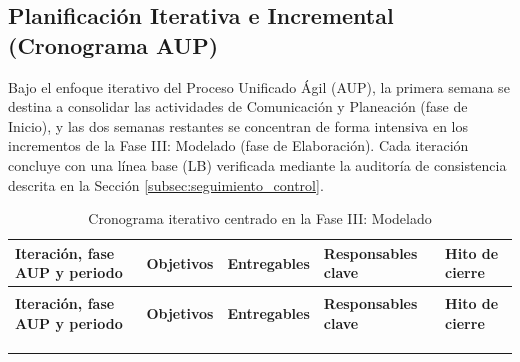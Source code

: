 \subsection{Planificación Iterativa e Incremental (Cronograma AUP)}

Bajo el enfoque iterativo del Proceso Unificado Ágil (AUP), la primera semana se destina a consolidar las actividades de Comunicación y Planeación (fase de Inicio), y las dos semanas restantes se concentran de forma intensiva en los incrementos de la Fase III: Modelado (fase de Elaboración). Cada iteración concluye con una línea base (LB) verificada mediante la auditoría de consistencia descrita en la Sección \ref{subsec:seguimiento_control}.

{\footnotesize
\begin{xltabular}{\textwidth}{|>{\raggedright\arraybackslash}p{2.4cm}|>{\raggedright\arraybackslash}p{3.2cm}|X|>{\raggedright\arraybackslash}p{2.2cm}|>{\raggedright\arraybackslash}p{2.4cm}|}
    \caption{Cronograma iterativo centrado en la Fase III: Modelado}
    \label{tab:cronograma_iterativo} \\
    \hline
    \textbf{Iteración, fase AUP y periodo} & \textbf{Objetivos} & \textbf{Entregables} & \textbf{Responsables clave} & \textbf{Hito de cierre} \\
    \hline
    \endfirsthead

     \\
    \hline
    \textbf{Iteración, fase AUP y periodo} & \textbf{Objetivos} & \textbf{Entregables} & \textbf{Responsables clave} & \textbf{Hito de cierre} \\
    \hline
    \endhead

     \\
    \endfoot

     \\
    \endlastfoot


\end{xltabular}}
